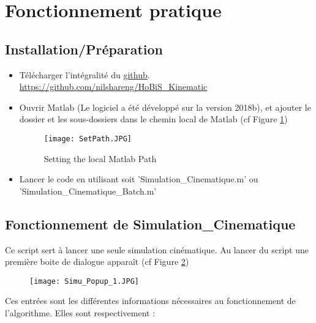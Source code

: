 \documentclass{article}
\begin{document}
\section{Fonctionnement pratique}

\subsection{Installation/Préparation}

\begin{itemize}
    \item Télécharger l'intégralité du \hyperlink{https://github.com/nilshareng/HoBiS_Kinematics}{github}. \hyperlink{https://github.com/nilshareng/HoBiS_Kinematics}{https://github.com/nilshareng/HoBiS\_Kinematic}

    \item Ouvrir Matlab (Le logiciel a été développé sur la version 2018b), et ajouter le dossier et les sous-dossiers dans le chemin local de Matlab (cf Figure \ref{fig:Path}) 
    
    \begin{figure}[H]
    \centering
    \texttt{[image: SetPath.JPG]}
    \caption{Setting the local Matlab Path}
    \label{fig:Path}
    \end{figure}
    
    \item Lancer le code en utilisant soit 'Simulation\_Cinematique.m' ou 'Simulation\_Cinematique\_Batch.m' 

\end{itemize}

\subsection{Fonctionnement de Simulation\_Cinematique}

Ce script sert à lancer une seule simulation cinématique.
%
Au lancer du script une première boite de dialogue apparaît (cf Figure \ref{fig:Popup1})

\begin{figure}[H]
    \centering
    \texttt{[image: Simu\_Popup\_1.JPG]}
    \caption{}
    \label{fig:Popup1}
\end{figure}
    
Ces entrées sont les différentes informations nécessaires au fonctionnement de l'algorithme.
%
Elles sont respectivement :
\end{document}
